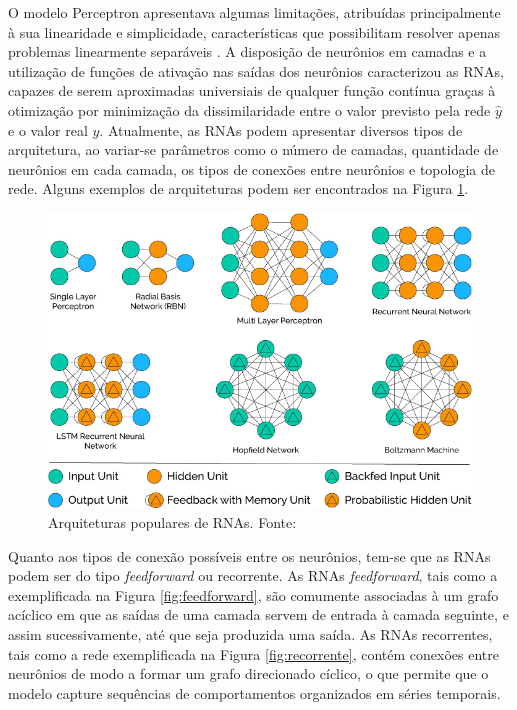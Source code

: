 O modelo Perceptron apresentava algumas limitações, atribuídas principalmente à sua linearidade e simplicidade, características que possibilitam resolver apenas problemas linearmente separáveis \cite{Teresa:Livro}. A disposição de neurônios em camadas e a utilização de funções de ativação nas saídas dos neurônios caracterizou as RNAs, capazes de serem aproximadas universiais de qualquer função contínua graças à otimização por minimização da dissimilaridade entre o valor previsto pela rede $\hat{y}$ e o valor real $y$. Atualmente, as RNAs podem apresentar diversos tipos de arquitetura, ao variar-se parâmetros como o número de camadas, quantidade de neurônios em cada camada, os tipos de conexões entre neurônios e topologia de rede. Alguns exemplos de arquiteturas podem ser encontrados na Figura \ref{fig:popular_archs}.

\begin{figure}[!h]
	\caption{Arquiteturas populares de RNAs. Fonte: \cite{rnas_tipos}}
	\label{fig:popular_archs}
	\includegraphics[width=\linewidth]{img/popular_archs}
\end{figure}


Quanto aos tipos de conexão possíveis entre os neurônios, tem-se que as RNAs podem ser do tipo \emph{feedforward} ou recorrente. As RNAs \emph{feedforward}, tais como a exemplificada na Figura \ref{fig:feedforward}, são comumente associadas à um grafo acíclico em que as saídas de uma camada servem de entrada à camada seguinte, e assim sucessivamente, até que seja produzida uma saída. As RNAs recorrentes, tais como a rede exemplificada na Figura \ref{fig:recorrente}, contém conexões entre neurônios de modo a formar um grafo direcionado cíclico, o que permite que o modelo capture sequências de comportamentos organizados em séries temporais.

